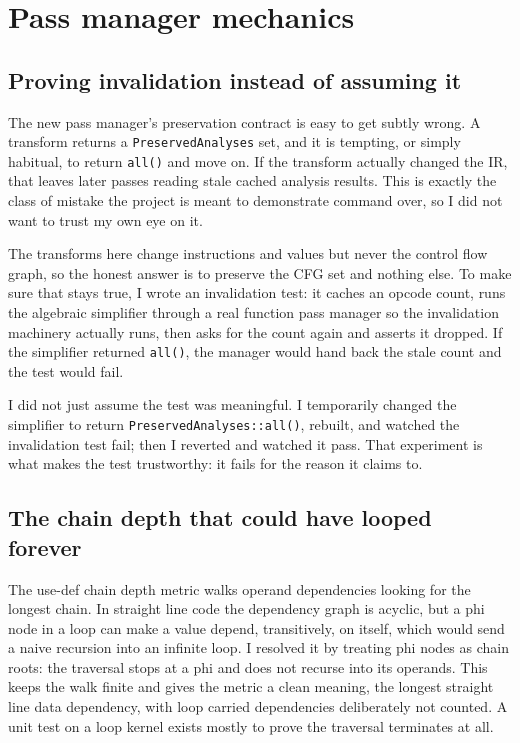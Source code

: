 \section{Pass manager mechanics}

\subsection{Proving invalidation instead of assuming it}

The new pass manager's preservation contract is easy to get subtly wrong. A
transform returns a \texttt{PreservedAnalyses} set, and it is tempting, or simply
habitual, to return \texttt{all()} and move on. If the transform actually changed
the IR, that leaves later passes reading stale cached analysis results. This is
exactly the class of mistake the project is meant to demonstrate command over, so
I did not want to trust my own eye on it.

The transforms here change instructions and values but never the control flow
graph, so the honest answer is to preserve the CFG set and nothing else. To make
sure that stays true, I wrote an invalidation test: it caches an opcode count,
runs the algebraic simplifier through a real function pass manager so the
invalidation machinery actually runs, then asks for the count again and asserts
it dropped. If the simplifier returned \texttt{all()}, the manager would hand back
the stale count and the test would fail.

I did not just assume the test was meaningful. I temporarily changed the
simplifier to return \texttt{PreservedAnalyses::all()}, rebuilt, and watched the
invalidation test fail; then I reverted and watched it pass. That experiment is
what makes the test trustworthy: it fails for the reason it claims to.

\subsection{The chain depth that could have looped forever}

The use-def chain depth metric walks operand dependencies looking for the longest
chain. In straight line code the dependency graph is acyclic, but a phi node in a
loop can make a value depend, transitively, on itself, which would send a naive
recursion into an infinite loop. I resolved it by treating phi nodes as chain
roots: the traversal stops at a phi and does not recurse into its operands. This
keeps the walk finite and gives the metric a clean meaning, the longest straight
line data dependency, with loop carried dependencies deliberately not counted. A
unit test on a loop kernel exists mostly to prove the traversal terminates at
all.
